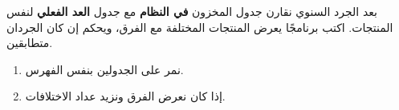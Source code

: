 \begin{statement}
بعد الجرد السنوي نقارن جدول المخزون \textbf{في النظام} مع جدول \textbf{العد الفعلي} لنفس المنتجات. اكتب برنامجًا يعرض المنتجات المختلفة مع الفرق، ويحكم إن كان الجردان متطابقين.
\end{statement}
\begin{stepsbox}\begin{enumerate}
\item نمر على الجدولين بنفس الفهرس.
\item إذا كان  نعرض الفرق ونزيد عداد الاختلافات.
\end{enumerate}\end{stepsbox}
